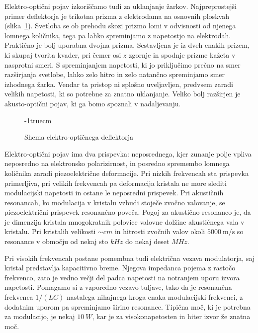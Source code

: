 \begin{remark}
Elektro-optični pojav izkoriščamo tudi za uklanjanje žarkov. 
Najpreprostejši primer deflektorja je trikotna prizma z elektrodama na osnovnih 
ploskvah (slika~\ref{fig:deflshema}). Svetloba se ob prehodu skozi prizmo lomi v odvisnosti od njenega 
lomnega količnika, tega pa lahko spreminjamo 
z napetostjo na elektrodah. Praktično je bolj uporabna dvojna prizma. Sestavljena je iz dveh enakih 
prizem, ki skupaj tvorita kvader, pri čemer osi $z$ zgornje in spodnje prizme
kažeta v nasprotni smeri. S spreminjanjem napetosti, ki jo priključimo prečno na smer
razširjanja svetlobe, lahko zelo hitro in zelo natančno spreminjamo smer izhodnega žarka. 
Vendar ta pristop ni splošno uveljavljen, predvsem zaradi velikih napetosti, ki so 
potrebne za znatno uklanjanje. Veliko bolj razširjen je akusto-optični pojav, ki ga 
bomo spoznali v nadaljevanju. 
\begin{figure}[h]
\centering
\def\svgwidth{85truemm} 

\caption{Shema elektro-optičnega deflektorja}
\vglue-1truecm
\label{fig:deflshema}
\end{figure}
\end{remark}
\begin{remark}
Elektro-optični pojav ima dva prispevka: neposrednega, kjer zunanje polje 
vpliva neposredno na elektronsko polarizirnost, in posredno spremembo
lomnega količnika zaradi piezoelektrične deformacije. Pri nizkih frekvencah sta prispevka 
primerljiva, pri velikih frekvencah pa deformacija kristala ne more slediti
modulacijski napetosti in ostane le neposredni prispevek. Pri akustičnih resonancah, ko 
modulacija v kristalu vzbudi stoječe zvočno valovanje, se piezoelektrični 
prispevek resonančno poveča. Pogoj za akustično resonanco je, da je dimenzija 
kristala mnogokratnik polovice valovne dolžine akustičnega vala v kristalu. 
Pri kristalih velikosti $\sim \si{cm}$ in hitrosti zvočnih valov okoli
$5000~\si{\m/\s}$ so resonance v območju od nekaj sto $\si{kHz}$ do
nekaj deset $\si{MHz}$. 

Pri visokih frekvencah postane pomembna tudi električna vezava modulatorja,
saj kristal predstavlja kapacitivno breme. Njegova impedanca pojema z 
rastočo frekvenco, zato je vedno večji del padca napetosti na notranjem 
uporu izvora napetosti. Pomagamo si z vzporedno vezavo tuljave, 
tako da je resonančna frekvenca $1/(LC)$ nastalega nihajnega kroga 
enaka modulacijski frekvenci, z dodatnim uporom pa spreminjamo širino resonance.
Tipična moč, ki je potrebna za modulacijo, je nekaj $10~\si{W}$, 
kar je za visokonapetosten in hiter izvor že znatna moč. 
\end{remark}

